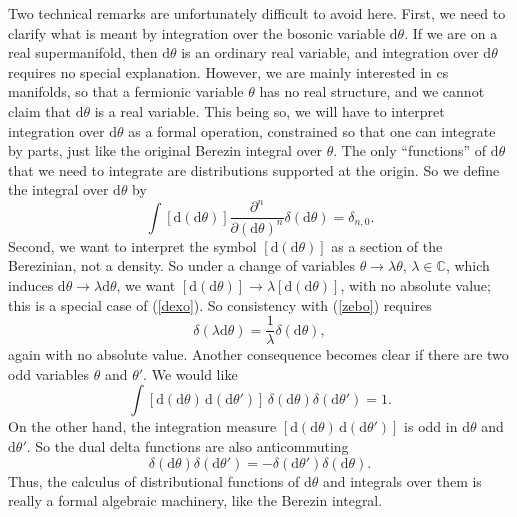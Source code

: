 \documentclass[11pt,a4paper]{article}
\def\d{{\mathrm d}}
\def\C{{\mathbb C}}
\begin{document}
Two technical remarks  are unfortunately difficult to avoid here.  First, we need to clarify what is meant
by integration over the bosonic variable $\d\theta$.  If we are on a real supermanifold, then $\d\theta$ is an ordinary
real variable, and integration over $\d\theta$ requires no special explanation. However, we are mainly interested in cs
manifolds, so that a fermionic variable $\theta$ has no real structure, and we cannot claim that $\d\theta$ is a real  variable.
This being so, we will have to interpret integration over $\d\theta$ as a formal operation, constrained so that one
can integrate by parts, just like the original Berezin integral over $\theta$.
The only ``functions'' of $\d\theta$ that we need to integrate are distributions supported at the origin.  So we define
the integral over $\d\theta$ by
\begin{equation}\label{zebo}\int[\d (\d\theta)]\frac{\partial^n}{\partial(\d\theta)^n}\delta(\d\theta)=\delta_{n,0}.\end{equation}
Second, we want to interpret the symbol $[\d(\d\theta)]$ as a section of the Berezinian, not a density.
So under a change of variables $\theta\to\lambda\theta$, $\lambda\in \C$, which induces $\d\theta\to \lambda\d\theta$, we want
 $[\d(\d\theta)]\to \lambda[\d(\d\theta)]$, with no absolute value; this is a special case of (\ref{dexo}).  So consistency with (\ref{zebo}) requires
 \begin{equation}\label{oxco}\delta(\lambda\d\theta)=\frac{1}{\lambda}\delta(\d\theta),\end{equation} again
 with no absolute value. Another consequence becomes clear if there are two odd variables $\theta$ and $\theta'$.  We would like
 \begin{equation}\label{zobort}\int [\d(\d\theta)\, \d(\d\theta')] \,\delta(\d\theta)\delta(\d\theta')=1.\end{equation}
 On the other hand, the integration measure $[\d(\d\theta)\,\d(\d\theta')]$ is odd in $\d\theta$ and $\d\theta'$.  So
 the dual delta functions are also anticommuting
 \begin{equation}\label{obort} \delta(\d\theta)\delta(\d\theta')=-\delta(\d\theta')\delta(\d\theta).\end{equation}
   Thus, the calculus of distributional functions of $\d\theta$ and integrals over them is really
 a formal algebraic machinery, like the Berezin integral. 
 
\end{document}
